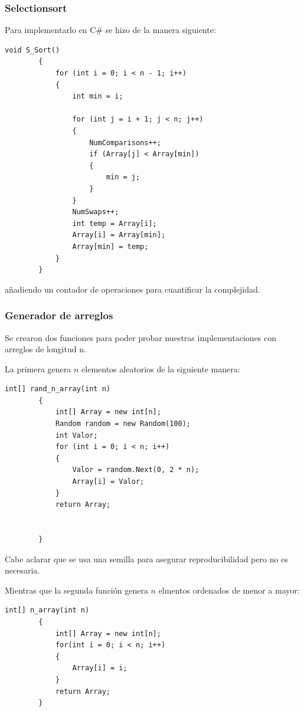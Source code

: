 \documentclass[conference]{IEEEtran}
\begin{document}
\subsubsection{Selectionsort}
Para implementarlo en C\# se hizo de la manera siguiente:
\begin{verbatim}
void S_Sort()
        {
            for (int i = 0; i < n - 1; i++)
            {
                int min = i;

                for (int j = i + 1; j < n; j++)
                {
                    NumComparisons++;
                    if (Array[j] < Array[min])
                    {
                        min = j;
                    }
                }
                NumSwaps++;
                int temp = Array[i];
                Array[i] = Array[min];
                Array[min] = temp;
            }
        }
\end{verbatim}
añadiendo un contador de operaciones para cuantificar la complejidad.

\subsubsection{Generador de arreglos}
Se crearon dos funciones para poder probar nuestras implementaciones con arreglos de longitud n.\par
La primera genera $n$ elementos aleatorios de la siguiente manera:

\begin{verbatim}
int[] rand_n_array(int n)
        {
            int[] Array = new int[n];
            Random random = new Random(100);
            int Valor;
            for (int i = 0; i < n; i++)
            {
                Valor = random.Next(0, 2 * n);
                Array[i] = Valor;
            }
            return Array;


        }
\end{verbatim}

Cabe aclarar que se usa una semilla para asegurar reproducibilidad pero no es necesaria.\par
Mientras que la segunda función genera $n$ elmentos ordenados de menor a mayor:

\begin{verbatim}
int[] n_array(int n)
        {
            int[] Array = new int[n];
            for(int i = 0; i < n; i++)
            {
                Array[i] = i;
            }
            return Array;
        }
\end{verbatim}
\end{document}
